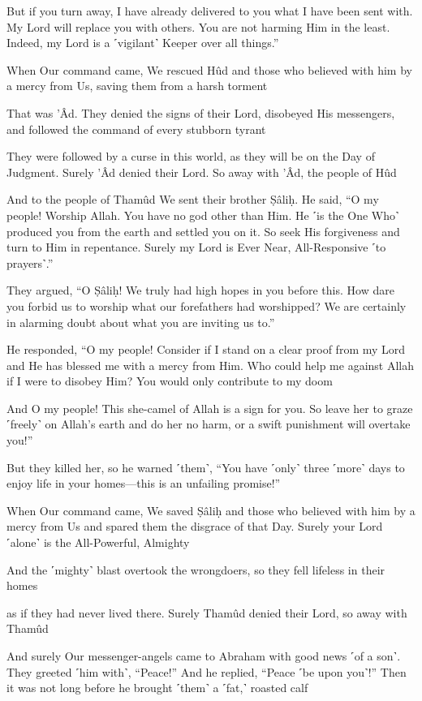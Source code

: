 But if you turn away, I have already delivered to you what I have been sent with. My Lord will replace you with others. You are not harming Him in the least. Indeed, my Lord is a ˹vigilant˺ Keeper over all things.”

When Our command came, We rescued Hûd and those who believed with him by a mercy from Us, saving them from a harsh torment

That was ’Âd. They denied the signs of their Lord, disobeyed His messengers, and followed the command of every stubborn tyrant

They were followed by a curse in this world, as they will be on the Day of Judgment. Surely ’Âd denied their Lord. So away with ’Âd, the people of Hûd

And to the people of Thamûd We sent their brother Ṣâliḥ. He said, “O my people! Worship Allah. You have no god other than Him. He ˹is the One Who˺ produced you from the earth and settled you on it. So seek His forgiveness and turn to Him in repentance. Surely my Lord is Ever Near, All-Responsive ˹to prayers˺.”

They argued, “O Ṣâliḥ! We truly had high hopes in you before this. How dare you forbid us to worship what our forefathers had worshipped? We are certainly in alarming doubt about what you are inviting us to.”

He responded, “O my people! Consider if I stand on a clear proof from my Lord and He has blessed me with a mercy from Him. Who could help me against Allah if I were to disobey Him? You would only contribute to my doom

And O my people! This she-camel of Allah is a sign for you. So leave her to graze ˹freely˺ on Allah’s earth and do her no harm, or a swift punishment will overtake you!”

But they killed her, so he warned ˹them˺, “You have ˹only˺ three ˹more˺ days to enjoy life in your homes—this is an unfailing promise!”

When Our command came, We saved Ṣâliḥ and those who believed with him by a mercy from Us and spared them the disgrace of that Day. Surely your Lord ˹alone˺ is the All-Powerful, Almighty

And the ˹mighty˺ blast overtook the wrongdoers, so they fell lifeless in their homes

as if they had never lived there. Surely Thamûd denied their Lord, so away with Thamûd

And surely Our messenger-angels came to Abraham with good news ˹of a son˺. They greeted ˹him with˺, “Peace!” And he replied, “Peace ˹be upon you˺!” Then it was not long before he brought ˹them˺ a ˹fat,˺ roasted calf

